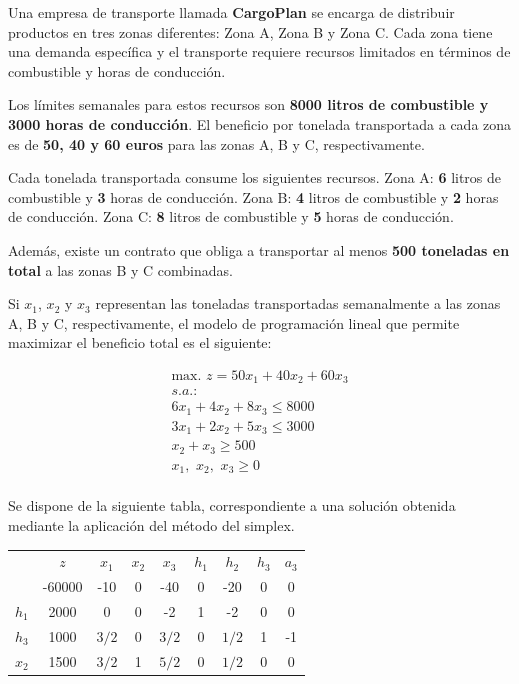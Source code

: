 Una empresa de transporte llamada \textbf{CargoPlan} se encarga de distribuir productos en tres zonas diferentes: Zona A, Zona B y Zona C. 
Cada zona tiene una demanda específica y el transporte requiere recursos limitados en términos de combustible y horas de conducción.

Los límites semanales para estos recursos son \textbf{8000 litros de combustible y 3000 horas de conducción}. El beneficio por tonelada transportada a cada zona es de \textbf{50, 40 y 60 euros} para las zonas A, B y C, respectivamente.

Cada tonelada transportada consume los siguientes recursos. Zona A: \textbf{6} litros de combustible y \textbf{3} horas de conducción. Zona B: \textbf{4} litros de combustible y \textbf{2} horas de conducción. Zona C: \textbf{8} litros de combustible y \textbf{5} horas de conducción.

Además, existe un contrato que obliga a transportar al menos \textbf{500 toneladas en total} a las zonas B y C combinadas.


Si $x_1$, $x_2$ y $x_3$ representan las toneladas transportadas semanalmente a las zonas A, B y C, respectivamente, el modelo de programación lineal que permite maximizar el beneficio total es el siguiente:

\begin{equation}
\begin{split}
\nonumber
\mbox{max. } z = 50x_1 + 40x_2 + 60x_3\\
s.a.:\\
6x_1 + 4x_2 + 8x_3 \leq 8000\\
3x_1 + 2x_2 + 5x_3 \leq 3000\\
        x_2 +  x_3 \geq 500\\
x_1,\,\,x_2,\,\,x_3\geq 0\\
\end{split}
\end{equation}

Se dispone de la siguiente tabla, correspondiente a una solución obtenida mediante la aplicación del método del simplex.

\begin{center}
\begin{tabular}{c|c|ccccccc|}
 & $z$ & $x_1$ & $x_2$ & $x_3$ & $h_1$ & $h_2$ & $h_3$ & $a_3$\\ 
 & -60000 & -10 & 0 & -40 & 0 & -20 & 0 & 0 \\ 
\hline
$h_1$ & 2000  & 0 & 0 & -2 & 1 & -2 & 0 & 0\\ 
$h_3$ & 1000  & $3/2$ & 0 & $3/2$ & 0 & $1/2$ & 1 & -1\\ 
$x_2$ & 1500  & $3/2$ & 1 & $5/2$ & 0 & $1/2$ & 0 & 0\\ 
\hline
\end{tabular}
\end{center}


